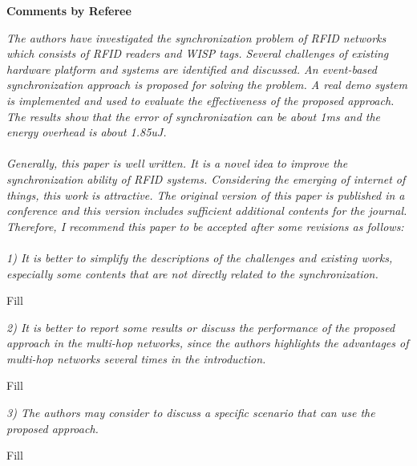 \documentclass[10pt]{article}
\newcommand{\referee}[1]{{\item \color{OliveGreen} \emph{{#1}}}}
\newcommand{\response}[1]{{\color{blue} #1}}
\newcounter{refereeCounter}
\newenvironment{responses}{%
\refstepcounter{refereeCounter}%
\textbf{\large Comments by Referee \therefereeCounter}
\begin{enumerate}%
\renewcommand{\labelenumi}{\textbf{[R\therefereeCounter :\,\arabic{enumi}]}} %
}{\end{enumerate}}
\begin{document}
\begin{responses}
	
\referee{The authors have investigated the synchronization problem of RFID networks which consists of RFID readers and WISP tags. Several challenges of existing hardware platform and systems are identified and discussed. An event-based synchronization approach is proposed for solving the problem. A real demo system is implemented and used to evaluate the effectiveness of the proposed approach. The results show that the error of synchronization can be about 1ms and the energy overhead is about 1.85uJ. \\
\\
Generally, this paper is well written. It is a novel idea to improve the synchronization ability of RFID systems. Considering the emerging of internet of things, this work  is attractive.  The original version of this paper is published in a conference and this version includes sufficient additional contents for the journal. Therefore, I recommend this paper to be accepted after some revisions as follows:  \\
\\
1) It is better to simplify the descriptions of the challenges and existing works, especially some contents that are not directly related to the synchronization.}
	
\response{
	Fill
}

\referee{2) It is better to report some results or discuss the performance of the proposed approach in the multi-hop networks, since the authors highlights the advantages of  multi-hop networks several times in the introduction.}
	
\response{
	Fill
}
	
\referee{3) The authors may consider to discuss a specific scenario that can use the proposed approach.}
	
\response{
	Fill
}

\end{responses}
\end{document}
